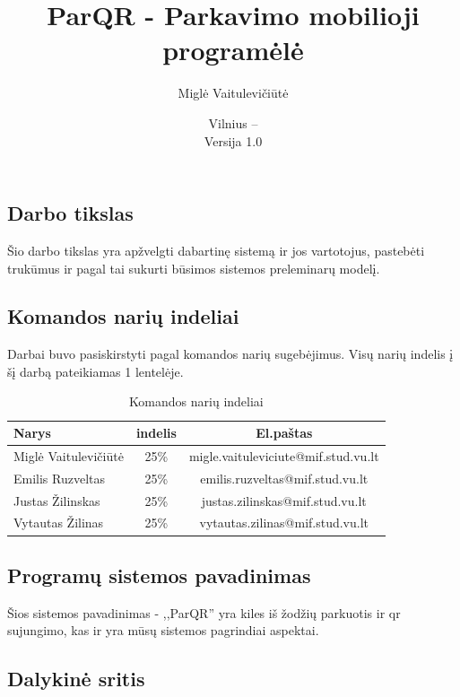 \documentclass{VUMIFPSkursinis}
\title{ParQR - Parkavimo mobilioji programėlė}
\author{Miglė Vaitulevičiūtė}
\date{Vilnius – \the\year\\Versija 1.0}
\begin{document}
\maketitle

\tableofcontents
{}

\subsection*{Darbo tikslas}

Šio darbo tikslas yra apžvelgti dabartinę sistemą ir jos vartotojus, pastebėti trukūmus ir pagal tai sukurti būsimos sistemos preleminarų modelį.

\subsection*{Komandos narių indeliai}

Darbai buvo pasiskirstyti pagal komandos narių sugebėjimus. Visų narių indelis į šį darbą pateikiamas 1 lentelėje.

\begin{table}[H]\footnotesize
  \centering
  \caption{Komandos narių indeliai}
  {\begin{tabular}{|l|c|c|} \hline
    Narys & indelis & El.paštas \\
    \hline
    Miglė Vaitulevičiūtė& 25\% & migle.vaituleviciute@mif.stud.vu.lt       		\\
    Emilis Ruzveltas 	& 25\% & emilis.ruzveltas@mif.stud.vu.lt       			\\
    Justas Žilinskas 	& 25\% & justas.zilinskas@mif.stud.vu.lt       			\\
    Vytautas Žilinas 	& 25\% & vytautas.zilinas@mif.stud.vu.lt       			\\
    \hline
  \end{tabular}}
  \label{tab:komanda}
\end{table}


\subsection*{Programų sistemos pavadinimas}

Šios sistemos pavadinimas - ,,ParQR'' yra kiles iš žodžių parkuotis ir qr sujungimo, kas ir yra mūsų sistemos pagrindiai aspektai.

\subsection*{Dalykinė sritis}
\end{document}
